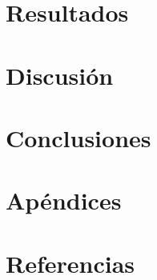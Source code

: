 \documentclass[10pt,a4paper]{article}
\begin{document}
\section{Resultados}

\section{Discusión}

\section{Conclusiones}

\section{Apéndices}

\section{Referencias}
\end{document}
